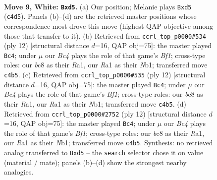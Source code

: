 \documentclass[11pt]{article}
\begin{document}
\clearpage

\begin{figure}[p]\centering
\begin{subfigure}{0.46\textwidth}\centering
\resizebox{\linewidth}{!}{%
\newchessgame
\chessboard[
  setfen={r1bqkb1r/pp2pppp/2np4/3nP3/2BP3P/5N2/PP3PP1/RNBQK2R w KQq - 3 9},
  showmover=false,
  pgfstyle=straightmove, color=movearrow, markmove={c4-d5}
]}
\caption{}
\end{subfigure}\hfill
\begin{subfigure}{0.46\textwidth}\centering
\resizebox{\linewidth}{!}{%
\newchessgame
\chessboard[
  setfen={r1bqkb1r/pp2pppp/2np4/3nP3/3P4/5N2/PP3PPP/RNBQKB1R w KQkq - 2 7},
  showmover=false,
  pgfstyle=straightmove, color=movearrow, markmove={f1-c4}
]}
\caption{}
\end{subfigure}
\\[4pt]
\begin{subfigure}{0.46\textwidth}\centering
\resizebox{\linewidth}{!}{%
\newchessgame
\chessboard[
  setfen={r1bqkb1r/pp2pppp/2np4/3nP3/3P4/5N2/PP3PPP/RNBQKB1R w KQkq - 2 7},
  showmover=false,
  pgfstyle=straightmove, color=movearrow, markmove={f1-c4}
]}
\caption{}
\end{subfigure}\hfill
\begin{subfigure}{0.46\textwidth}\centering
\resizebox{\linewidth}{!}{%
\newchessgame
\chessboard[
  setfen={r1bqkb1r/pp2pppp/2np4/3nP3/3P4/5N2/PP3PPP/RNBQKB1R w KQkq - 2 7},
  showmover=false,
  pgfstyle=straightmove, color=movearrow, markmove={f1-c4}
]}
\caption{}
\end{subfigure}
\caption{\textbf{Move 9, White: \texttt{Bxd5}.} (a) Our position; Melanie plays \texttt{Bxd5} (\texttt{c4d5}). Panels (b)--(d) are the retrieved master positions whose correspondence most drove this move (highest QAP objective among those that transfer to it). (b) Retrieved from \texttt{ccrl\_top\_p0000\#534} (ply 12) [structural distance $d$=16, QAP obj=75]: the master played \texttt{Bc4}; under $\mu$ our \emph{Bc4} plays the role of that game's \emph{Bf1}; cross-type roles: our \emph{b}c8 as their \emph{R}a1, our \emph{R}a1 as their \emph{N}b1; transferred move \texttt{c4b5}. (c) Retrieved from \texttt{ccrl\_top\_p0000\#535} (ply 12) [structural distance $d$=16, QAP obj=75]: the master played \texttt{Bc4}; under $\mu$ our \emph{Bc4} plays the role of that game's \emph{Bf1}; cross-type roles: our \emph{b}c8 as their \emph{R}a1, our \emph{R}a1 as their \emph{N}b1; transferred move \texttt{c4b5}. (d) Retrieved from \texttt{ccrl\_top\_p0000\#2752} (ply 12) [structural distance $d$=16, QAP obj=75]: the master played \texttt{Bc4}; under $\mu$ our \emph{Bc4} plays the role of that game's \emph{Bf1}; cross-type roles: our \emph{b}c8 as their \emph{R}a1, our \emph{R}a1 as their \emph{N}b1; transferred move \texttt{c4b5}. Synthesis: no retrieved analog transferred to \texttt{Bxd5} -- the \texttt{search} selector chose it on value (material / mate); panels (b)--(d) show the strongest nearby analogies.}
\label{fig:thought-m16}
\end{figure}
\end{document}
